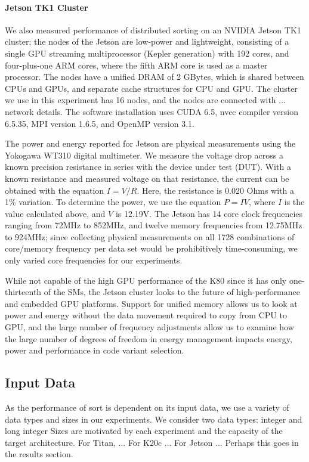 \paragraph{Jetson TK1 Cluster}
We also measured performance of distributed sorting on an NVIDIA 
Jetson TK1 cluster; the nodes of the Jetson are low-power and lightweight,
consisting of a single GPU streaming multiprocessor (Kepler generation)
with 192 cores, and 
four-plus-one ARM cores, where the fifth ARM core is used as a master processor.
The nodes have a unified DRAM of 2 GBytes, which is shared between CPUs and
GPUs, and separate cache structures for CPU and GPU.
The cluster we use in this experiment has 16 nodes, and
the nodes are connected with {\color{red} ... network details.}
The software installation uses CUDA 6.5, nvcc compiler version 6.5.35,
MPI version 1.6.5, and OpenMP version 3.1.

The power and energy reported for
Jetson are physical measurements  
using the Yokogawa WT310 digital multimeter.
We measure the voltage drop across a known precision resistance in series with the device under test (DUT).
With a known resistance and measured voltage on that resistance,
the current can be obtained with the equation $I=V/R$.
Here, the resistance is 0.020 Ohms with a 1\% variation.
To determine the power, we use the equation $P=IV$, where $I$ is the value calculated above, and $V$ is 12.19V.
The Jetson has 14 core clock frequencies ranging from 72MHz to 852MHz,
and twelve memory frequencies from 12.75MHz to 924MHz;
since collecting physical measurements 
on all 1728 combinations of core/memory frequency per data set would 
be prohibitively time-consuming, we only varied core frequencies for our experiments.

While not capable of the high GPU performance of the K80
since it has only one-thirteenth of the SMs,
the Jetson cluster looks to the future of high-performance and 
embedded GPU platforms. Support for unified memory allows us to look 
at power and energy without the data movement required to copy
from CPU to GPU, and the large number of frequency adjustments
allow us to examine how the large number of degrees of freedom
in energy management impacts energy, power and performance in 
code variant selection. 

\subsection{Input Data}
As the performance of sort is dependent on its input data, we 
use a variety of data types and sizes in our experiments.
We consider two data types: 
integer and long integer
Sizes are motivated by each experiment and the capacity of the
target architecture.
{\color{red} For Titan, ...  
For K20c ... For Jetson ...  Perhaps this goes in the results section.}

